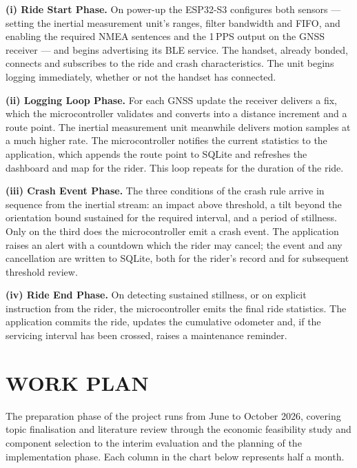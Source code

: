 \documentclass[12pt,a4paper,oneside]{report}
\begin{document}
\vspace{0.5em}
\noindent\textbf{(i) Ride Start Phase.} On power-up the ESP32-S3 configures both sensors ---
setting the inertial measurement unit's ranges, filter bandwidth and FIFO, and enabling the
required NMEA sentences and the 1\,PPS output on the GNSS receiver --- and begins
advertising its BLE service. The handset, already bonded, connects and subscribes to the
ride and crash characteristics. The unit begins logging immediately, whether or not the
handset has connected.

\vspace{0.5em}
\noindent\textbf{(ii) Logging Loop Phase.} For each GNSS update the receiver delivers a fix,
which the microcontroller validates and converts into a distance increment and a route point.
The inertial measurement unit meanwhile delivers motion samples at a much higher rate. The
microcontroller notifies the current statistics to the application, which appends the route
point to SQLite and refreshes the dashboard and map for the rider. This loop repeats for the
duration of the ride.

\vspace{0.5em}
\noindent\textbf{(iii) Crash Event Phase.} The three conditions of the crash rule arrive in
sequence from the inertial stream: an impact above threshold, a tilt beyond the orientation
bound sustained for the required interval, and a period of stillness. Only on the third does
the microcontroller emit a crash event. The application raises an alert with a countdown
which the rider may cancel; the event and any cancellation are written to SQLite, both for
the rider's record and for subsequent threshold review.

\vspace{0.5em}
\noindent\textbf{(iv) Ride End Phase.} On detecting sustained stillness, or on explicit
instruction from the rider, the microcontroller emits the final ride statistics. The
application commits the ride, updates the cumulative odometer and, if the servicing interval
has been crossed, raises a maintenance reminder.

\section{WORK PLAN}

The preparation phase of the project runs from June to October 2026, covering topic
finalisation and literature review through the economic feasibility study and component
selection to the interim evaluation and the planning of the implementation phase. Each
column in the chart below represents half a month.
\end{document}

